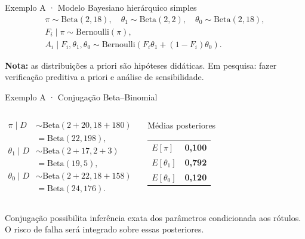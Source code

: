 \documentclass[aspectratio=169,11pt]{beamer}
\newcommand{\boxhead}[2]{\begin{block}{#1}#2\end{block}}
\begin{document}
\begin{frame}{Exemplo A · Modelo Bayesiano hierárquico simples}
\vspace{.18cm}
\[\begin{gathered}
\pi\sim\mathrm{Beta}(2,18),\quad \theta_1\sim\mathrm{Beta}(2,2),\quad\theta_0\sim\mathrm{Beta}(2,18),\\[5pt]
F_i\mid\pi\sim\mathrm{Bernoulli}(\pi),\\[-1pt]
A_i\mid F_i,\theta_1,\theta_0\sim\mathrm{Bernoulli}\!\left(F_i\theta_1+(1-F_i)\theta_0\right).
\end{gathered}\]
\vspace{.20cm}
\begin{center}
\end{center}
{\small \textbf{Nota:} as distribuições a priori são hipóteses didáticas. Em pesquisa: fazer verificação preditiva a priori e análise de sensibilidade.}
\end{frame}

\begin{frame}{Exemplo A · Conjugação Beta--Binomial}
\vspace{.10cm}
\begin{columns}[T]
\[\begin{aligned}
\pi\mid D &\sim \mathrm{Beta}(2+20,18+180)\\
&=\mathrm{Beta}(22,198),\\[7pt]
\theta_1\mid D &\sim \mathrm{Beta}(2+17,2+3)\\
&=\mathrm{Beta}(19,5),\\[7pt]
\theta_0\mid D &\sim \mathrm{Beta}(2+22,18+158)\\
&=\mathrm{Beta}(24,176).
\end{aligned}\]
\vspace{.35cm}
\boxhead{Médias posteriores}{\large\begin{tabular}{lr}$E[\pi]$&\textbf{0,100}\\[7pt]$E[\theta_1]$&\textbf{0,792}\\[7pt]$E[\theta_0]$&\textbf{0,120}\end{tabular}}
\end{columns}
\vspace{.10cm}
{\small\color{grey}Conjugação possibilita inferência exata dos parâmetros condicionada aos rótulos. O risco de falha será integrado sobre essas posteriores.}
\end{frame}
\end{document}
